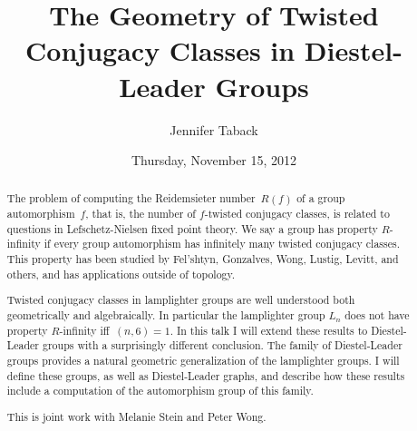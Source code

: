 \documentclass{UAmathtalk}
\author{Jennifer Taback}
\title{The Geometry of Twisted Conjugacy Classes in Diestel-Leader Groups}
\date{Thursday, November 15, 2012}
\begin{document}
\maketitle

\begin{abstract}
The problem of computing the Reidemsieter number~$R(f)$ of a group automorphism~$f$, that is, the number of $f$-twisted conjugacy classes, is related to questions in Lefschetz-Nielsen fixed point theory.  We say a group has property $R$-infinity if every group automorphism has infinitely many twisted conjugacy classes.  This property has been studied by Fel'shtyn, Gonzalves, Wong, Lustig, Levitt, and others, and has applications outside of topology.
 
Twisted conjugacy classes in lamplighter groups are well understood both geometrically and algebraically.  In particular the lamplighter group $L_n$ does not have property $R$-infinity iff~$(n,6)=1$. In this talk I will extend these results to Diestel-Leader groups with a surprisingly different conclusion.  The family of Diestel-Leader groups provides a natural geometric generalization of the lamplighter groups.  I will define these groups, as well as Diestel-Leader graphs, and describe how these results include a computation of the automorphism group of this family.
 
This is joint work with Melanie Stein and Peter Wong.
\end{abstract}
\end{document}
